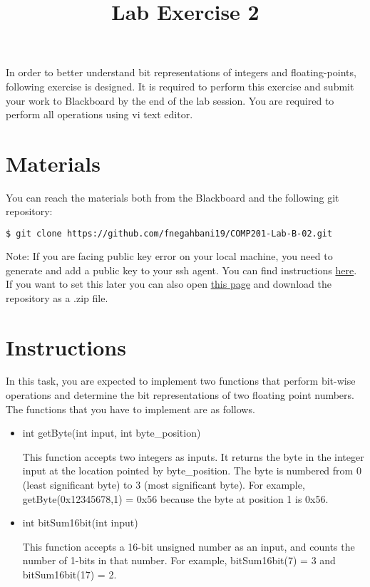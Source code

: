 \documentclass[twoside,11pt]{article}
\newcommand\assignmentNumber{2}
\begin{document}
    \title{Lab Exercise \assignmentNumber}
    \maketitle
In order to better understand bit representations of integers and floating-points, following exercise is designed. It is required to perform this exercise and submit your work to Blackboard by the end of the lab session. You are required to perform all operations using vi text editor.

\section{Materials}
You can reach the materials both from the Blackboard and the following git repository:

\begin{lstlisting}[language=bash] 
        $ git clone https://github.com/fnegahbani19/COMP201-Lab-B-02.git\end{lstlisting}

Note: If you are facing public key error on your local machine, you need to generate and add a public key to your ssh agent. You can find instructions \href{https://docs.github.com/en/enterprise/2.15/user/articles/generating-a-new-ssh-key-and-adding-it-to-the-ssh-agent}{here}. If you want to set this later you can also open \href{https://github.com/fnegahbani19/COMP201-Lab-B-02}{this page} and download the repository as a .zip file.

\section{Instructions}

In this task, you are expected to implement two functions that perform bit-wise operations and 
determine the bit representations of two floating point numbers. The functions that you have to 
implement are as follows.

\begin{itemize}
\item int getByte(int input, int byte\_position)

This function accepts two integers as inputs. It returns the byte in the integer input at the location pointed by byte\_position. The byte is numbered from 0 (least significant byte) to 3 (most significant byte). For example, getByte(0x12345678,1) = 0x56 because the byte at position 1 is 0x56.

\item int bitSum16bit(int input)

This function accepts a 16-bit unsigned number as an input, and counts the number of 1-bits in 
that number. For example, bitSum16bit(7) = 3 and bitSum16bit(17) = 2.

\end{itemize}
\end{document}
